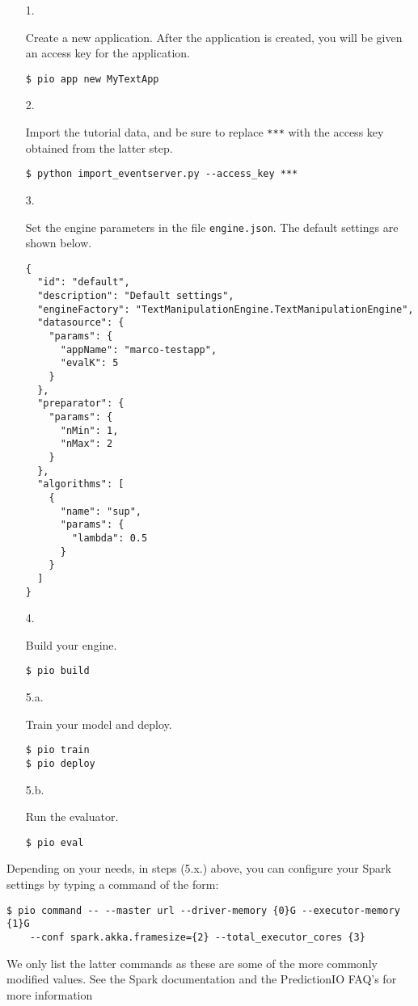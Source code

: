 \documentclass[a4paper,12pt]{article}
\renewcommand{\tt}[1]{\texttt{#1}}
\newcommand{\3}{\left}
\newcommand{\4}{\right}
\renewcommand{\-}[1]{{}^{-#1}}
\begin{document}
\begin{itemize}
\item[1.]{Create a new application. After the application is created, you will be given an access key for the application.
\begin{verbatim}
$ pio app new MyTextApp
\end{verbatim}}

\item[2.]{Import the tutorial data, and be sure to replace \tt{***} with the access key obtained from the latter step.
\begin{verbatim}
$ python import_eventserver.py --access_key ***
\end{verbatim}}

\item[3.]{Set the engine parameters in the file \tt{engine.json}. The default settings are shown below.
\begin{verbatim}
{
  "id": "default",
  "description": "Default settings",
  "engineFactory": "TextManipulationEngine.TextManipulationEngine",
  "datasource": {
    "params": {
      "appName": "marco-testapp",
      "evalK": 5
    }
  },
  "preparator": {
    "params": {
      "nMin": 1,
      "nMax": 2
    }
  },
  "algorithms": [
    {
      "name": "sup",
      "params": {
        "lambda": 0.5
      }
    }
  ]
}
\end{verbatim}}

\break

\item[4.]{Build your engine.
\begin{verbatim}
$ pio build
\end{verbatim}}

\item[5.a.]{Train your model and deploy.
\begin{verbatim}
$ pio train
$ pio deploy
\end{verbatim}}

\item[5.b.]{Run the evaluator.
\begin{verbatim}
$ pio eval
\end{verbatim}}
\end{itemize}

Depending on your needs, in steps (5.x.) above, you can configure your Spark settings by typing a command of the form:
\begin{verbatim}
$ pio command -- --master url --driver-memory {0}G --executor-memory {1}G 
	--conf spark.akka.framesize={2} --total_executor_cores {3}
\end{verbatim}
We only list the latter commands as these are some of the more commonly modified values. See the Spark documentation
and the PredictionIO FAQ's 
for more information
\end{document}
